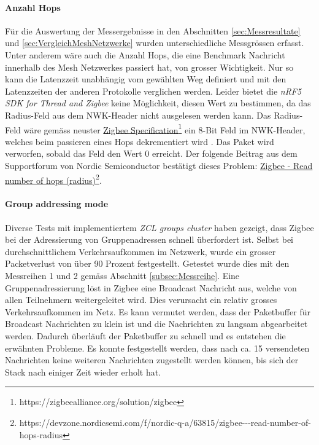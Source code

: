 \paragraph{Anzahl Hops}
Für die Auswertung der Messergebnisse in den Abschnitten \ref{sec:Messresultate} und \ref{sec:VergleichMeshNetzwerke} wurden unterschiedliche Messgrössen erfasst.
Unter anderem wäre auch die Anzahl Hops, die eine Benchmark Nachricht innerhalb des Mesh Netzwerkes passiert hat, von grosser Wichtigkeit.
Nur so kann die Latenzzeit unabhängig vom gewählten Weg definiert und mit den Latenzzeiten der anderen Protokolle verglichen werden.
Leider bietet die \textit{nRF5 SDK for Thread and Zigbee} keine Möglichkeit, diesen Wert zu bestimmen, da das Radius-Feld aus dem NWK-Header nicht ausgelesen werden kann.
Das Radius-Feld wäre gemäss neuster \href{https://zigbeealliance.org/solution/zigbee}{Zigbee Specification\footnote{\url{https://zigbeealliance.org/solution/zigbee}\cite{the_zigbee_alliance_zigbee_2015}}} ein 8-Bit Feld im NWK-Header, welches beim passieren eines Hops dekrementiert wird \cite{the_zigbee_alliance_zigbee_2015}.
Das Paket wird verworfen, sobald das Feld den Wert 0 erreicht.
Der folgende Beitrag aus dem Supportforum von Nordic Semiconductor bestätigt dieses Problem: \href{https://devzone.nordicsemi.com/f/nordic-q-a/63815/zigbee---read-number-of-hops-radius}{Zigbee - Read number of hops (radius)\footnote{\url{https://devzone.nordicsemi.com/f/nordic-q-a/63815/zigbee---read-number-of-hops-radius}\cite{cyrill_horath_zigbee_2020}}}.

\paragraph{Group addressing mode}
Diverse Tests mit implementiertem \textit{ZCL groups cluster} haben gezeigt, dass Zigbee bei der Adressierung von Gruppenadressen schnell überfordert ist.
Selbst bei durchschnittlichem Verkehrsaufkommen im Netzwerk, wurde ein grosser Packetverlust von über 90 Prozent festgestellt.
Getestet wurde dies mit den Messreihen 1 und 2 gemäss Abschnitt \ref{subsec:Messreihe}.
Eine Gruppenadressierung löst in Zigbee eine Broadcast Nachricht aus, welche von allen Teilnehmern weitergeleitet wird.
Dies verursacht ein relativ grosses Verkehrsaufkommen im Netz. 
Es kann vermutet werden, dass der Paketbuffer für Broadcast Nachrichten zu klein ist und die Nachrichten zu langsam abgearbeitet werden.
Dadurch überläuft der Paketbuffer zu schnell und es entstehen die erwähnten Probleme.
Es konnte festgestellt werden, dass nach ca. 15 versendeten Nachrichten keine weiteren Nachrichten zugestellt werden können, bis sich der Stack nach einiger Zeit wieder erholt hat.

